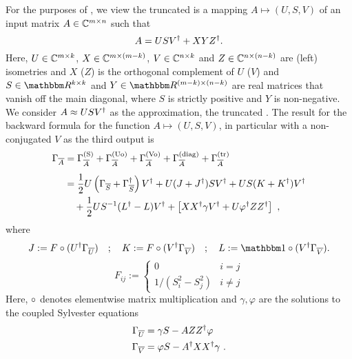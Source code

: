 For the purposes of , we view the truncated  is a mapping $A \mapsto (U, S, V)$ of an input matrix $A \in \mathbb{C}^{m \times n}$ such that
\begin{equation}
    A = U S V^\dagger + X Y Z^\dagger
    .
\end{equation}
Here, $U \in \mathbb{C}^{m\times k}$, $X \in \mathbb{C}^{m\times (m-k)}$, $V \in \mathbb{C}^{n\times k}$ and $Z \in \mathbb{C}^{n \times (n-k)}$ are (left) isometries and $X$ ($Z$) is the orthogonal complement of $U$ ($V$) and $S \in \Rbb^{k \times k}$ and $Y \in \Rbb^{(m - k) \times (n - k)}$ are real matrices that vanish off the main diagonal, where $S$ is strictly positive and $Y$ is non-negative.
%
We consider $A \approx U S V^\dagger$ as the approximation, the truncated .
%
The result for the  backward formula for the function $A \mapsto (U, S, V)$, in particular with a non-conjugated $V$ as the third output is
\begin{align}
    \label{eq:grapeps:autodiff:svd_result}
    \begin{split}
        \Gamma_{\overline{A}}
        &= \Gamma_{\overline{A}}^\text{(S)} + \Gamma_{\overline{A}}^\text{(Uo)} + \Gamma_{\overline{A}}^\text{(Vo)} + \Gamma_{\overline{A}}^\text{(diag)} + \Gamma_{\overline{A}}^\text{(tr)}
        \\[1ex]
        &= \frac{1}{2} U \left( \Gamma_{\overline{S}} + \Gamma_{\overline{S}}^\dagger \right) V^\dagger
        + U (J + J^\dagger) S V^\dagger
        + U S (K + K^\dagger) V^\dagger
        \\
        &\quad+ \frac{1}{2} U S^{-1} (L^\dagger - L) V^\dagger
        + \left[XX^\dagger \gamma V^\dagger + U \varphi^\dagger Z Z^\dagger \right]
        ~,
    \end{split}
\end{align}
where
\begin{equation}
    J := F \hadamard (U^\dagger \Gamma_{\conj{U}})
    \quad ; \quad
    K := F \hadamard (V^\dagger \Gamma_{\conj{V}})
    \quad ; \quad
    L := \eye \hadamard (V^\dagger \Gamma_{\conj{V}})
    .
\end{equation}
\begin{equation}
    F_{ij} := \begin{cases} 0 & i = j \\ 1 / (S_i^2 - S_j^2) & i \neq j \end{cases}
\end{equation}
Here, $\circ$ denotes elementwise matrix multiplication and $\gamma, \varphi$ are the solutions to the coupled Sylvester equations
\begin{align}
    \label{eq:gradpeps:autodiff:sylvester_eqs}
    \begin{split}
        \Gamma_{\overline{U}} &= \gamma S - A Z Z^\dagger \varphi
        \\
        \Gamma_{\overline{V}} &= \varphi S - A^\dagger X X^\dagger \gamma
        ~.
    \end{split}
\end{align}

